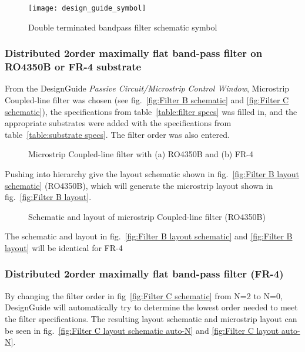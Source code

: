 \documentclass[report.tex]{subfiles}
\begin{document}
\begin{figure}[H]
    \centering
    \texttt{[image: design\_guide\_symbol]}
    \caption{Double terminated bandpass filter schematic symbol}
    \label{fig:Filter A}
\end{figure}

\subsubsection{Distributed 2\nd order maximally flat band-pass filter on RO4350B or FR-4 substrate}
From the DesignGuide \emph{Passive Circuit/Microstrip Control Window}, Microstrip Coupled-line filter was chosen (see fig.~\ref{fig:Filter B schematic} and \ref{fig:Filter C schematic}), the specifications from table~\ref{table:filter specs} was filled in, and the appropriate substrates were added with the specifications from table~\ref{table:substrate specs}. The filter order was also entered.

\begin{figure}[h]
    \centering
    \caption{Microstrip Coupled-line filter with (a) RO4350B and (b) FR-4}
\end{figure}

Pushing into hierarchy give the layout schematic shown in fig.~\ref{fig:Filter B layout schematic} (RO4350B), which will generate the microstrip layout shown in fig.~\ref{fig:Filter B layout}.

\begin{figure}[h]
    \centering
    
    \caption{Schematic and layout of microstrip Coupled-line filter (RO4350B)}
\end{figure}

The schematic and layout in fig.~\ref{fig:Filter B layout schematic} and \ref{fig:Filter B layout} will be identical for FR-4

\subsubsection{Distributed 2\nd order maximally flat band-pass filter (FR-4)}
By changing the filter order in fig~\ref{fig:Filter C schematic} from N=2 to N=0, DesignGuide will automatically try to determine the lowest order needed to meet the filter specifications. The resulting layout schematic and microstrip layout can be seen in fig.~\ref{fig:Filter C layout schematic auto-N} and \ref{fig:Filter C layout auto-N}.
\end{document}
